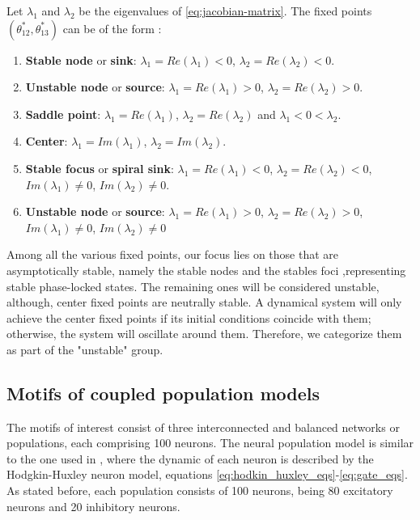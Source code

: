 \documentclass[../main.tex]{subfiles}
\begin{document}
Let $\lambda_1$ and $\lambda_2$ be the eigenvalues of \eqref{eq:jacobian-matrix}. 
The fixed points $(\theta^{*}_{12}, \theta^{*}_{13})$ can be of the form \citep{zill2012differential}:
\begin{enumerate}
    \item \textbf{Stable node} or \textbf{sink}: $\lambda_1 = Re(\lambda_1) <0$, $\lambda_2 = Re(\lambda_2) < 0$.
    \item \textbf{Unstable node} or \textbf{source}:  $\lambda_1 = Re(\lambda_1)>0$, $\lambda_2 = Re(\lambda_2) > 0$.
    \item \textbf{Saddle point}: $\lambda_1 = Re(\lambda_1)$, $\lambda_2 = Re(\lambda_2)$ and $\lambda_1 < 0 < \lambda_2$. 
    \item \textbf{Center}: $\lambda_1 = Im(\lambda_1)$, $\lambda_2 = Im(\lambda_2)$.
    \item \textbf{Stable focus} or \textbf{spiral sink}: $\lambda_1 = Re (\lambda_1) <0$, $\lambda_2 = Re(\lambda_2) < 0$, $Im(\lambda_1)\neq0$, $Im(\lambda_2)\neq0$.
    \item \textbf{Unstable node} or \textbf{source}: $\lambda_1 = Re(\lambda_1) >0$, $\lambda_2 = Re(\lambda_2) > 0$, $Im(\lambda_1)\neq0$, $Im(\lambda_2)\neq0$
\end{enumerate}
Among all the various fixed points, our focus lies on those that are asymptotically stable, namely the stable nodes and the stables foci ,representing stable phase-locked states.
The remaining ones will be considered unstable, although, center fixed points are neutrally stable.
A dynamical system will only achieve the center fixed points if its initial conditions coincide with them; otherwise, the system will oscillate around them.
Therefore, we categorize them as part of the "unstable" group.

\subsection{Motifs of coupled population models}
The motifs of interest consist of three interconnected and balanced networks or populations, each comprising 100 neurons.
The neural population model is similar to the one used in \citep{pariz_high_2018}, where the dynamic of each neuron is described by the Hodgkin-Huxley neuron model, equations \eqref{eq:hodkin_huxley_eqs}-\eqref{eq:gate_eqs}.
As stated before, each population consists of 100 neurons, being 80 excitatory neurons and 20 inhibitory neurons.
\end{document}
